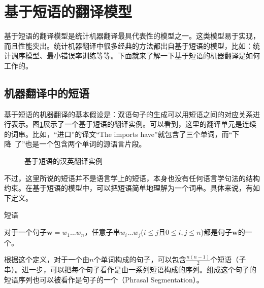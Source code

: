\sectionnewpage
\section{基于短语的翻译模型}\label{section-4.2}

\parinterval 基于短语的翻译模型是统计机器翻译最具代表性的模型之一\cite{koehn2003statistical,chiang2007hierarchical}。这类模型易于实现，而且性能突出。统计机器翻译中很多经典的方法都出自基于短语的模型，比如：统计调序模型、最小错误率训练等等。下面就来了解一下基于短语的机器翻译是如何工作的。


\subsection{机器翻译中的短语}

\parinterval 基于短语的机器翻译的基本假设是：双语句子的生成可以用短语之间的对应关系进行表示。图\ref{fig:4-9}展示了一个基于短语的翻译实例。可以看到，这里的翻译单元是连续的词串。比如，``进口''的译文``The imports have''就包含了三个单词，而``下降\ 了''也是一个包含两个单词的源语言片段。

\begin{figure}[htp]
\centering

\caption{基于短语的汉英翻译实例}
\label{fig:4-9}
\end{figure}

\parinterval 不过，这里所说的短语并不是语言学上的短语，本身也没有任何语言学句法的结构约束。在基于短语的模型中，可以把短语简单地理解为一个词串。具体来说，有如下定义。

\vspace{0.5em}
\begin{definition} 短语

{\small
对于一个句子$\mathbf{w} = w_1...w_n$，任意子串$w_i...w_j$($i\leq j$且$0\leq i,j\leq n$)都是句子$\mathbf{w}$的一个{\small{}}。
}
\end{definition}

\parinterval 根据这个定义，对于一个由$n$个单词构成的句子，可以包含$\frac{n(n-1)}{2}$个短语（子串）。进一步，可以把每个句子看作是由一系列短语构成的序列。组成这个句子的短语序列也可以被看作是句子的一个{\small{}}（Phrasal Segmentation）。

